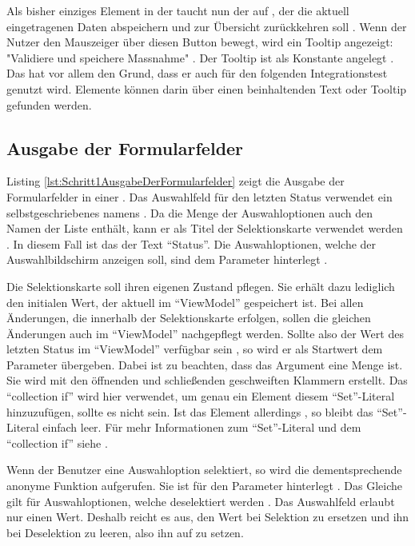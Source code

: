 Als bisher einziges Element in der   taucht nun der  auf ,
der die aktuell eingetragenen Daten abspeichern  und zur Übersicht zurückkehren soll .
Wenn der Nutzer den Mauszeiger über diesen Button bewegt,
wird ein Tooltip angezeigt: "Validiere und speichere Massnahme" .
Der Tooltip ist als Konstante angelegt .
Das hat vor allem den Grund,
dass er auch für den folgenden Integrationstest genutzt wird. Elemente können darin über einen beinhaltenden Text oder Tooltip gefunden werden.




\subsection{Ausgabe der Formularfelder}

Listing \ref{lst:Schritt1AusgabeDerFormularfelder} zeigt die Ausgabe der Formularfelder in einer  .
Das Auswahlfeld für den letzten Status verwendet ein selbstgeschriebenes  namens  .
Da die Menge der Auswahloptionen auch den Namen der Liste enthält, kann er als Titel der Selektionskarte verwendet werden . In diesem Fall ist das der Text \enquote{Status}.
Die Auswahloptionen, welche  der Auswahlbildschirm anzeigen soll, sind dem Parameter  hinterlegt .

Die Selektionskarte soll ihren eigenen Zustand pflegen.
Sie erhält dazu lediglich den initialen Wert, der aktuell im \enquote{ViewModel} gespeichert ist.
Bei allen Änderungen, die innerhalb der Selektionskarte erfolgen, sollen die gleichen Änderungen auch im \enquote{ViewModel} nachgepflegt werden.
Sollte also der Wert des letzten Status im \enquote{ViewModel} verfügbar sein , so wird er als Startwert dem Parameter   übergeben.
Dabei ist zu beachten, dass das Argument eine Menge ist.
Sie wird mit den  öffnenden und schließenden geschweiften Klammern erstellt.
Das \enquote{collection if} wird hier verwendet, um genau ein Element diesem \enquote{Set}-Literal hinzuzufügen, sollte es nicht  sein.
Ist das Element allerdings , so bleibt das \enquote{Set}-Literal einfach leer.
Für mehr Informationen zum \enquote{Set}-Literal und dem \enquote{collection if} siehe .


Wenn der Benutzer eine Auswahloption selektiert, so  wird die dementsprechende anonyme Funktion aufgerufen.
Sie ist für den Parameter  hinterlegt .
Das Gleiche gilt für Auswahloptionen, welche deselektiert werden .
Das Auswahlfeld erlaubt nur einen Wert.
Deshalb reicht es aus, den Wert bei Selektion zu ersetzen und ihn bei Deselektion zu leeren, also ihn auf  zu setzen.


